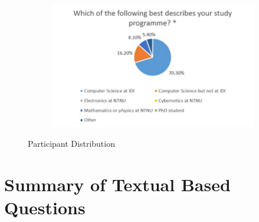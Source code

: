 \begin{figure}
\begin{subfigure}[h]{0.4\textwidth}
        \includegraphics[width=1.5\textwidth, height=1.0\textwidth]{oldresults/distribution.jpg}
        \caption{}
        \label{fig:participants}
    \end{subfigure}
    \caption{Participant Distribution}
    \label{fig:oldsurvey-dist}
\end{figure}

\section{Summary of Textual Based Questions}
